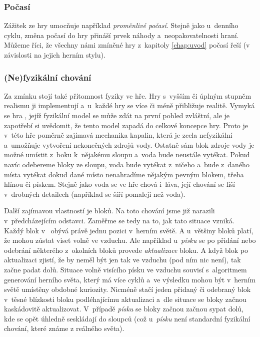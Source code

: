 \subsubsection{Počasí}
Zážitek ze hry umocňuje například \textit{proměnlivé počasí}. Stejně jako u~denního cyklu, změna počasí do hry přináší prvek náhody a~neopakovatelnosti hraní. Můžeme říci, že všechny námi zmíněné hry z~kapitoly \ref{chap:uvod} počasí řeší (v závislosti na jejich herním stylu). 

\subsubsection{(Ne)fyzikální chování}

Za zmínku stojí také přítomnost fyziky ve hře. Hry s~vyšším či úplným stupněm realismu ji implementují a~u~každé hry se více či méně přibližuje realitě. Vymyká se hra \MC{}, jejíž fyzikální model se může zdát na první pohled zvláštní, ale je zapotřebí si uvědomit, že tento model zapadá do celkové koncepce hry. Proto je v~této hře poměrně zajímavá mechanika kapalin, která je zcela nefyzikální a~umožňuje vytvoření nekonečných zdrojů vody. Ostatně sám blok zdroje vody je možné umístit z~boku k~nějakému sloupu a~voda bude neustále vytékat. Pokud navíc odebereme bloky ze sloupu, voda bude vytékat z~ničeho a~bude z~daného místa vytékat dokud dané místo nenahradíme nějakým pevným blokem, třeba hlínou či pískem. Stejně jako voda se ve hře chová i~láva, její chování se liší v~drobných detailech (například se šíří pomaleji než voda).

Další zajímavou vlastností je  bloků. Na toto chování jsme již narazili v~předcházejícím odstavci. Zaměřme se tedy na to, jak tato situace vzniká. Každý blok v~ obývá právě jednu pozici v~herním světě. A u~většiny bloků platí, že mohou zůstat viset volně ve vzduchu. Ale například u~\textit{písku} se po přidání nebo odebrání některého z~okolních bloků provede \textit{aktualizace} bloku. A když blok po aktualizaci zjistí, že by neměl být jen tak ve vzduchu (pod ním nic není), tak začne padat dolů. Situace volně visícího písku ve vzduchu souvisí s~algoritmem generování herního světa, který má více cyklů a~ve výsledku mohou být v~herním světě umístěny obdobné kuriozity. Nicméně stačí jeden přidaný či odebraný blok v~těsné blízkosti bloku podléhajícímu aktualizaci a~dle situace se bloky začnou kaskádovitě aktualizovat. V~případě \textit{písku} se bloky začnou začnou sypat dolů, kde se opět úhledně seskládají do sloupců (což u~\textit{písku} není standardní fyzikální chování, které známe z reálného světa).


